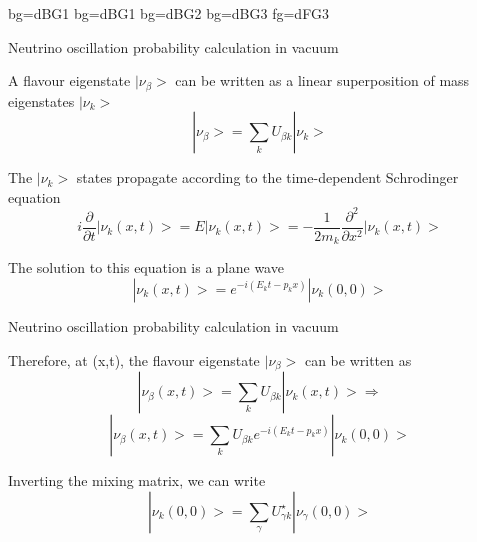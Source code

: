 %
%
%

{

          {bg=dBG1}
 {bg=dBG1}
  {bg=dBG2}
   {bg=dBG3}
   {fg=dFG3}

%
%
%

\begin{frame}{Neutrino oscillation probability calculation in vacuum}

A flavour eigenstate $|\nu_{\beta}>$ can be written as a linear superposition
of mass eigenstates $|\nu_{k}>$
\begin{equation*}
    |\nu_{\beta}> = \sum_{k} U_{{\beta}k} |\nu_{k}>
\end{equation*}

The $|\nu_{k}>$ states propagate according to the time-dependent Schrodinger equation
\begin{equation*}
    i \frac{\partial}{\partial t} |\nu_{k}(x,t)> = E |\nu_{k}(x,t)>
     = - \frac{1}{2m_{k}} \frac{\partial^{2}}{\partial x^{2}} |\nu_{k}(x,t)>
\end{equation*}

The solution to this equation is a plane wave
\begin{equation*}
    |\nu_{k}(x,t)> = e^{-i(E_{k}t-p_{k}x)} |\nu_{k}(0,0)>
\end{equation*}

\end{frame}

%
%
%

\begin{frame}{Neutrino oscillation probability calculation in vacuum}

Therefore, at (x,t), the flavour eigenstate $|\nu_{\beta}>$ can be written as
\begin{equation*}
    |\nu_{\beta}(x,t)> = \sum_{k} U_{{\beta}k} |\nu_{k}(x,t)> \Rightarrow
\end{equation*}
\begin{equation*}
    |\nu_{\beta}(x,t)> = \sum_{k} U_{{\beta}k} e^{-i(E_{k}t-p_{k}x)} |\nu_{k}(0,0)>
\end{equation*}

Inverting the mixing matrix, we can write
\begin{equation*}
    |\nu_{k}(0,0)> = \sum_{\gamma} U^{\star}_{{\gamma}k} |\nu_{\gamma}(0,0)>
\end{equation*}


\end{frame}}
